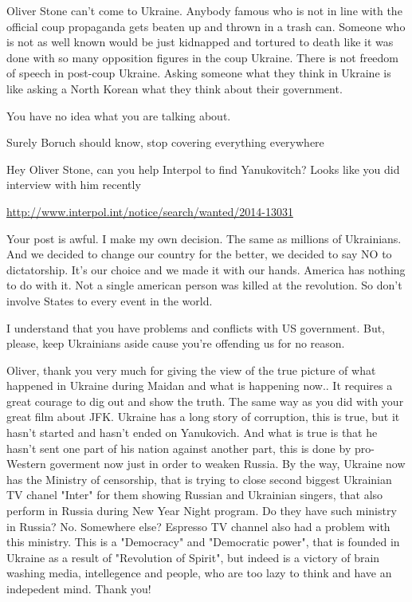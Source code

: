 \begin{itemize}

Oliver Stone can't come to Ukraine. Anybody famous who is not in line with the
official coup propaganda gets beaten up and thrown in a trash can. Someone who
is not as well known would be just kidnapped and tortured to death like it was
done with so many opposition figures in the coup Ukraine. There is not freedom
of speech in post-coup Ukraine. Asking someone what they think in Ukraine is
like asking a North Korean what they think about their government.

\begin{itemize} %
You have no idea what you are talking about.

Surely Boruch should know, stop covering everything everywhere
\end{itemize} %


Hey Oliver Stone, can you help Interpol to find Yanukovitch? Looks like you did interview with him recently

\url{http://www.interpol.int/notice/search/wanted/2014-13031}


Your post is awful. I make my own decision. The same as millions of Ukrainians.
And we decided to change our country for the better, we decided to say NO to
dictatorship. It's our choice and we made it with our hands. America has
nothing to do with it. Not a single american person was killed at the
revolution. So don't involve States to every event in the world.

I understand that you have problems and conflicts with US government. But,
please, keep Ukrainians aside cause you're offending us for no reason.



Oliver, thank you very much for giving the view of the true picture of what
happened in Ukraine during Maidan and what is happening now.. It requires a
great courage to dig out and show the truth. The same way as you did with your
great film about JFK. Ukraine has a long story of corruption, this is true, but
it hasn't started and hasn't ended on Yanukovich. And what is true is that he
hasn't sent one part of his nation against another part, this is done by
pro-Western goverment now just in order to weaken Russia. By the way, Ukraine
now has the Ministry of censorship, that is trying to close second biggest
Ukrainian TV chanel "Inter" for them showing Russian and Ukrainian singers,
that also perform in Russia during New Year Night program. Do they have such
ministry in Russia? No. Somewhere else? Espresso TV channel also had a problem
with this ministry. This is a "Democracy" and "Democratic power", that is
founded in Ukraine as a result of "Revolution of Spirit", but indeed is a
victory of brain washing media, intellegence and people, who are too lazy to
think and have an indepedent mind. Thank you!


\end{itemize}
